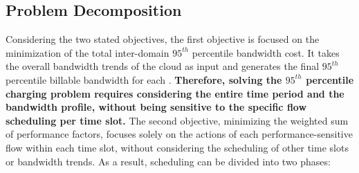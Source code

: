 



\subsection{Problem Decomposition} \label{sec:problem-decomp}
Considering the two stated objectives, the first objective is focused on the minimization of the total inter-domain $95^{th}$ percentile bandwidth cost. It takes the overall bandwidth trends of the cloud as input and generates the final $95^{th}$ percentile billable bandwidth for each {\egress}. \textbf{Therefore, solving the $95^{th}$ percentile charging problem requires considering the entire time period and the bandwidth profile, without being sensitive to the specific flow scheduling per time slot.} The second objective, minimizing the weighted sum of performance factors, focuses solely on the actions of each performance-sensitive flow within each time slot, without considering the scheduling of other time slots or bandwidth trends. As a result, scheduling can be divided into two phases:



